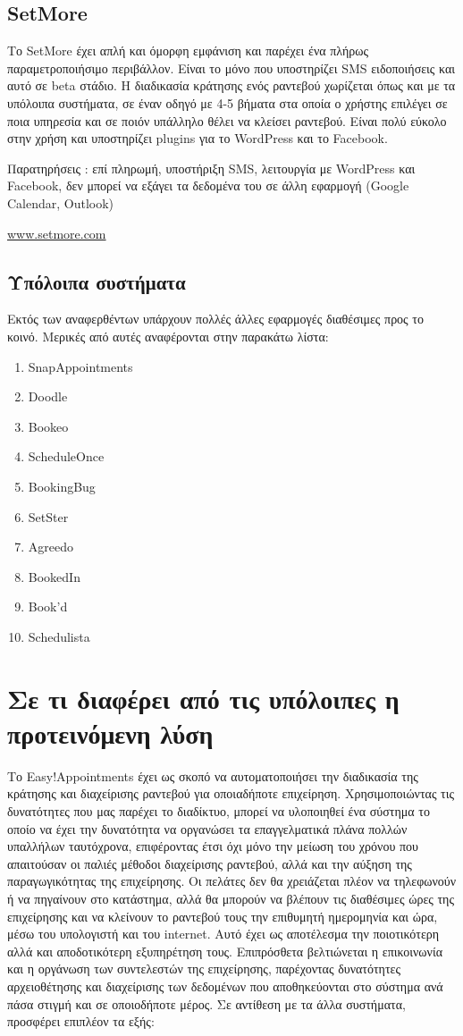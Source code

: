 \subsection{SetMore}
Το SetMore έχει απλή και όμορφη εμφάνιση και παρέχει ένα πλήρως παραμετροποιήσιμο περιβάλλον. Είναι το μόνο που υποστηρίζει SMS ειδοποιήσεις και αυτό σε beta στάδιο. Η διαδικασία κράτησης ενός ραντεβού χωρίζεται όπως και με τα υπόλοιπα συστήματα, σε έναν οδηγό με 4-5 βήματα στα οποία ο χρήστης επιλέγει σε ποια υπηρεσία και σε ποιόν υπάλληλο θέλει να κλείσει ραντεβού. Είναι πολύ εύκολο στην χρήση και υποστηρίζει plugins για το WordPress και το Facebook.

Παρατηρήσεις : επί πληρωμή, υποστήριξη SMS, λειτουργία με WordPress και Facebook, δεν μπορεί να εξάγει τα δεδομένα του σε άλλη εφαρμογή (Google Calendar, Outlook)

\href{http://www.setmore.com/}{www.setmore.com}

\subsection{Υπόλοιπα συστήματα}
Εκτός των αναφερθέντων υπάρχουν πολλές άλλες εφαρμογές διαθέσιμες προς το κοινό. Μερικές από αυτές αναφέρονται στην παρακάτω λίστα:
\begin{enumerate}
\item SnapAppointments
\item Doodle
\item Bookeo
\item ScheduleOnce
\item BookingBug
\item SetSter
\item Agreedo
\item BookedIn
\item Book'd
\item Schedulista
\end{enumerate}

\section{Σε τι διαφέρει από τις υπόλοιπες η προτεινόμενη λύση}
Το Easy!Appointments έχει ως σκοπό να αυτοματοποιήσει την διαδικασία της κράτησης και διαχείρισης ραντεβού για οποιαδήποτε επιχείρηση. Χρησιμοποιώντας τις δυνατότητες που μας παρέχει το διαδίκτυο, μπορεί να υλοποιηθεί ένα σύστημα το οποίο να έχει την δυνατότητα να οργανώσει τα επαγγελματικά πλάνα πολλών υπαλλήλων ταυτόχρονα, επιφέροντας έτσι όχι μόνο την μείωση του χρόνου που απαιτούσαν οι παλιές μέθοδοι διαχείρισης ραντεβού, αλλά και την αύξηση της παραγωγικότητας της επιχείρησης. Οι πελάτες δεν θα χρειάζεται πλέον να τηλεφωνούν ή να πηγαίνουν στο κατάστημα, αλλά θα μπορούν να βλέπουν τις διαθέσιμες ώρες της επιχείρησης και να κλείνουν το ραντεβού τους την επιθυμητή ημερομηνία και ώρα, μέσω του υπολογιστή και του internet. Αυτό έχει ως αποτέλεσμα την ποιοτικότερη αλλά και αποδοτικότερη εξυπηρέτηση τους. Επιπρόσθετα βελτιώνεται η επικοινωνία και η οργάνωση των συντελεστών της επιχείρησης, παρέχοντας δυνατότητες αρχειοθέτησης και διαχείρισης των δεδομένων που αποθηκεύονται στο σύστημα ανά πάσα στιγμή και σε οποιοδήποτε μέρος. Σε αντίθεση με τα άλλα συστήματα, προσφέρει επιπλέον τα εξής:

